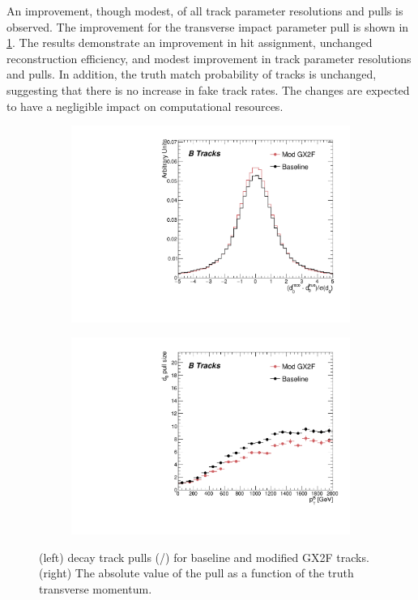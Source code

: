 An improvement, though modest, of all track parameter resolutions and pulls is observed.
The improvement for the transverse impact parameter pull is shown in \cref{fig:gx2f_opt_pulls}.
The results demonstrate an improvement in hit assignment, unchanged reconstruction efficiency, and modest improvement in track parameter resolutions and pulls. In addition, the truth match probability of tracks is unchanged, suggesting that there is no increase in fake track rates. The changes are expected to have a negligible impact on computational resources.

\begin{figure}[!htbp]
    \centering
    \begin{subfigure}{.48\textwidth}
      \centering
      \includegraphics[width=\textwidth]{chapters/3.tracking/figs/h_recoTruthPull_d0_From_B.pdf}
    \end{subfigure}%
    \begin{subfigure}{.48\textwidth}
      \centering
      \includegraphics[width=\textwidth]{chapters/3.tracking/figs/p_d0_pull_size_pTB_From_B.pdf}
    \end{subfigure}
    \caption{(left) \bhadron decay track \dzero pulls (\dzero/\dzerosig) for baseline and modified GX2F tracks. (right) The absolute value of the \dzero pull as a function of the truth \bhadron transverse momentum.}
    \label{fig:gx2f_opt_pulls}
\end{figure}

